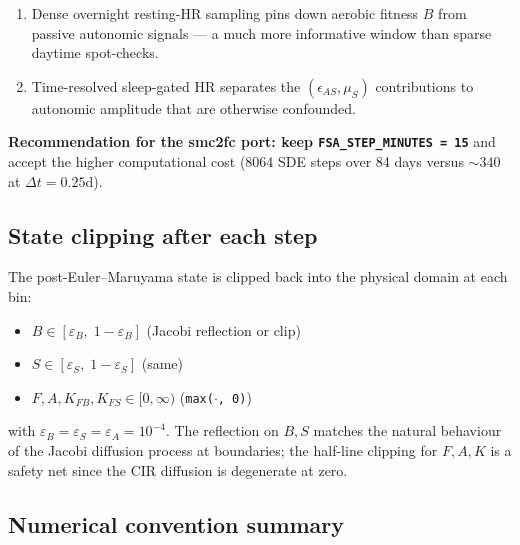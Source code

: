 \documentclass[11pt,a4paper]{article}
\theoremstyle{definition}
\begin{document}
\begin{enumerate}
  \item Dense overnight resting-HR sampling pins down aerobic fitness
        $B$ from passive autonomic signals --- a much more informative
        window than sparse daytime spot-checks.
  \item Time-resolved sleep-gated HR separates the
        $(\epsilon_{AS}, \mu_S)$ contributions to autonomic
        amplitude that are otherwise confounded.
\end{enumerate}

\textbf{Recommendation for the smc2fc port: keep \texttt{FSA\_STEP\_MINUTES = 15}}
and accept the higher computational cost (8064 SDE steps over 84 days
versus $\sim 340$ at $\Delta t = 0.25$d).

\subsection{State clipping after each step}

The post-Euler--Maruyama state is clipped back into the physical
domain at each bin:

\begin{itemize}
  \item $B \in [\varepsilon_B,\; 1 - \varepsilon_B]$ (Jacobi reflection or clip)
  \item $S \in [\varepsilon_S,\; 1 - \varepsilon_S]$ (same)
  \item $F, A, K_{FB}, K_{FS} \in [0, \infty)$ (\texttt{max(\(\cdot\), 0)})
\end{itemize}

with $\varepsilon_B = \varepsilon_S = \varepsilon_A = 10^{-4}$. The
reflection on $B, S$ matches the natural behaviour of the Jacobi
diffusion process at boundaries; the half-line clipping for $F, A, K$
is a safety net since the CIR diffusion is degenerate at zero.

\subsection{Numerical convention summary}
\end{document}
